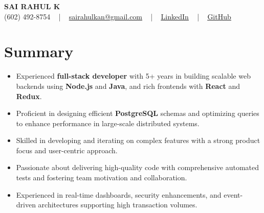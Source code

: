 \documentclass[letterpaper,11pt]{article}
\newcommand{\resumeItem}[1]{
  \item\footnotesize{
    {#1 \vspace{-2pt}}
  }
}
\newcommand{\resumeItemListStart}{\begin{itemize}[leftmargin=*]}
\newcommand{\resumeItemListEnd}{\end{itemize}\vspace{-5pt}}
\begin{document}
\begin{center}
    {\fontsize{14pt}{12pt}\selectfont \textbf{\MakeUppercase{Sai Rahul K}}}\\ \vspace{2pt}
    \fontsize{10pt}{12pt}\selectfont (602) 492-8754 ~ | ~ \href{mailto:sairahulkan@gmail.com}{sairahulkan@gmail.com} ~ | ~
    \href{https://www.linkedin.com/in/rq123/}{\color{blue}\underline{LinkedIn}} ~ | ~
    \href{https://github.com/kanrahuldo}{\color{blue}\underline{GitHub}}~
    \vspace{-8pt}
\end{center}

\section{Summary}
\fontsize{9pt}{10pt}\selectfont
\resumeItemListStart
    \resumeItem{Experienced \textbf{full-stack developer} with 5+ years in building scalable web backends using \textbf{Node.js} and \textbf{Java}, and rich frontends with \textbf{React} and \textbf{Redux}.}
    \resumeItem{Proficient in designing efficient \textbf{PostgreSQL} schemas and optimizing queries to enhance performance in large-scale distributed systems.}
    \resumeItem{Skilled in developing and iterating on complex features with a strong product focus and user-centric approach.}
    \resumeItem{Passionate about delivering high-quality code with comprehensive automated tests and fostering team motivation and collaboration.}
    \resumeItem{Experienced in real-time dashboards, security enhancements, and event-driven architectures supporting high transaction volumes.}
\resumeItemListEnd
\vspace{-6pt}
\end{document}
